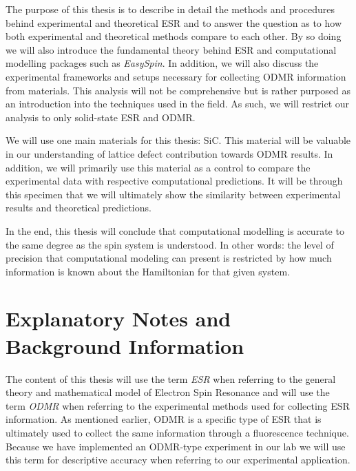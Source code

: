 \documentclass[oneside, astronomy, noacknowlegments]{BYUPhys}
\begin{document}
The purpose of this thesis is to describe in detail the methods and procedures behind experimental and theoretical ESR and to answer the question as to how both experimental and theoretical methods compare to each other. By so doing we will also introduce the fundamental theory behind ESR and computational modelling packages such as \textit{EasySpin}. In addition, we will also discuss the experimental frameworks and setups necessary for collecting ODMR information from materials. This analysis will not be comprehensive but is rather purposed as an introduction into the techniques used in the field. As such, we will restrict our analysis to only solid-state ESR and ODMR.

We will use one main materials for this thesis: SiC. This material will be valuable in our understanding of lattice defect contribution towards ODMR results. In addition, we will primarily use this material as a control to compare the experimental data with respective computational predictions. It will be through this specimen that we will ultimately show the similarity between experimental results and theoretical predictions.

In the end, this thesis will conclude that computational modelling is accurate to the same degree as the spin system is understood. In other words: the level of precision that computational modeling can present is restricted by how much information is known about the Hamiltonian for that given system.

\section{Explanatory Notes and Background Information}

The content of this thesis will use the term \textit{ESR} when referring to the general theory and mathematical model of Electron Spin Resonance and will use the term \textit{ODMR} when referring to the experimental methods used for collecting ESR information. As mentioned earlier, ODMR is a specific type of ESR that is ultimately used to collect the same information through a fluorescence technique. Because we have implemented an ODMR-type experiment in our lab we will use this term for descriptive accuracy when referring to our experimental application.
\end{document}
